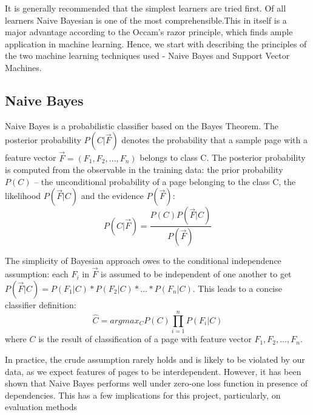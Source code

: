 \documentclass[12pt,notitlepage,twoside]{scrreprt}
\begin{document}
It is generally recommended that the simplest learners are tried
first\cite{domingos}. Of all learners Naive Bayesian is one of the most
comprehensible.This in itself is a major advantage according to the Occam's
razor principle, which finds ample application in machine learning.
Hence, we start with describing the principles of the two machine learning
techniques used - Naive Bayes and Support Vector Machines.

\subsection{Naive Bayes}

Naive Bayes is a probabilistic classifier based on the Bayes Theorem. The
posterior probability \(P(C|\vec{F})\) denotes the probability that a sample
page with a feature vector \(\vec{F}=(F_1,F_2,\dots,F_n)\) belongs to class C.
The posterior probability is computed from the observable in the training data: the prior
probability \(P(C)\) -- the unconditional probability of a page belonging to
the class C, the likelihood \(P(\vec{F}|C)\) and the evidence \(P(\vec{F})\):
\begin{equation}
P(C|\vec{F}) = \frac{P(C)P(\vec{F}|C)}{P(\vec{F})}
\end{equation}

The simplicity of Bayesian approach owes to the conditional independence
assumption: each \(F_i\) in \(\vec{F}\) is assumed to be independent of one
another to get \(P(\vec{F}|C)=P(F_1|C)*P(F_2|C)*\dots*P(F_n|C)\). This leads to a concise classifier definition:
\begin{equation}
\hat{C}= argmax_C P(C)\prod_{i=1}^{n}P(F_i|C)
\end{equation}
where \(C\) is the result of classification of a page with feature vector
\(F_1,F_2,\dots,F_n\).

In practice, the crude assumption rarely  holds and is likely to
be violated by our data, as we expect features of pages to be interdependent.
However, it has been shown that Naive Bayes performs well under zero-one loss
function in presence of dependencies\cite{OPTIM}. This has a few
implications for this project, particularly, on evaluation methods 
\end{document}
